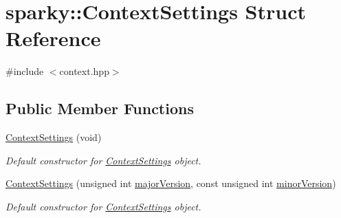 \hypertarget{structsparky_1_1_context_settings}{}\section{sparky\+:\+:Context\+Settings Struct Reference}
\label{structsparky_1_1_context_settings}


{\ttfamily \#include $<$context.\+hpp$>$}

\subsection*{Public Member Functions}
\begin{DoxyCompactItemize}
\item 
\hyperlink{structsparky_1_1_context_settings_af177c704b49dee968972514d4da4998a}{Context\+Settings} (void)
\begin{DoxyCompactList}\small\item\em Default constructor for \hyperlink{structsparky_1_1_context_settings}{Context\+Settings} object. \end{DoxyCompactList}\item 
\hyperlink{structsparky_1_1_context_settings_a91b058a76f4db0ec2da381f61a9f5987}{Context\+Settings} (unsigned int \hyperlink{structsparky_1_1_context_settings_a50930130c715417f92b072fb6fb41c80}{major\+Version}, const unsigned int \hyperlink{structsparky_1_1_context_settings_a4881a797d7349fb27df94de114ef9e8e}{minor\+Version})
\begin{DoxyCompactList}\small\item\em Default constructor for \hyperlink{structsparky_1_1_context_settings}{Context\+Settings} object. \end{DoxyCompactList}\end{DoxyCompactItemize}
